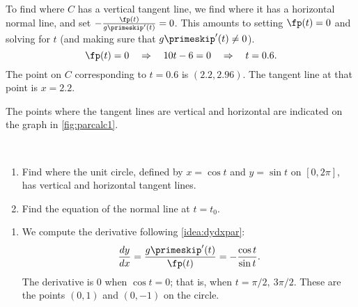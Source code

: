 \begin{example}
\begin{enumerate}
	To find where $C$ has a vertical tangent line, we find where it has a horizontal normal line, and set $-\frac{\fp(t)}{g\primeskip'(t)}=0$. This amounts to setting $\fp(t)=0$ and solving for $t$ (and making sure that $g\primeskip'(t)\neq 0$). 
	\[\fp(t)=0 \quad \Rightarrow \quad 10t-6=0 \quad \Rightarrow \quad t=0.6.\]
	The point on $C$ corresponding to $t=0.6$ is $(2.2,2.96)$. The tangent line at that point is $x=2.2$.
	
	The points where the tangent lines are vertical and horizontal are indicated on the graph in \autoref{fig:parcalc1}.
\end{enumerate}
\end{example}

\begin{example}\label{ex_parcalc2}
\mbox{}\\[-2\baselineskip]\parbox[t]{\linewidth}{\begin{enumerate}
	\item	Find where the unit circle, defined by $x=\cos t$ and $y=\sin t$ on $[0,2\pi]$, has vertical and horizontal tangent lines. 
	\item	 Find the equation of the normal line at $t=t_0$.
\end{enumerate}}\vspace{0pt}
\solution
\begin{enumerate}
	\item We compute the derivative following \autoref{idea:dydxpar}:
	\[\frac{dy}{dx} = \frac{g\primeskip'(t)}{\fp(t)} = -\frac{\cos t}{\sin t}.\]
	The derivative is $0$ when $\cos t= 0$; that is, when $t=\pi/2,\ 3\pi/2$. These are the points $(0,1)$ and $(0,-1)$ on the circle.


\end{enumerate}
\end{example}
